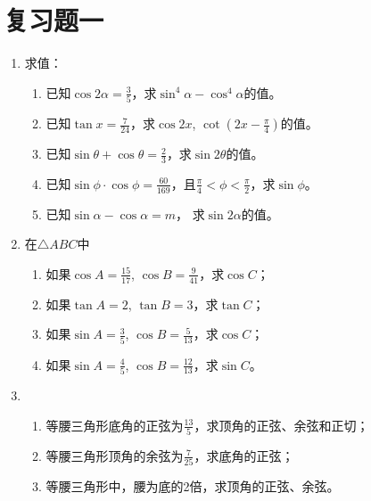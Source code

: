 \section*{复习题一}
\begin{enumerate}
    \item 求值：
\begin{enumerate}
    \item 已知$\cos2\alpha=\frac{3}{5}$，求$\sin^4\alpha-\cos^4\alpha$的值。
    \item 已知$\tan x=\frac{7}{24}$，求$\cos2x$, $\cot\left(2x-\frac{\pi}{4}\right)$的值。
    \item 已知$\sin\theta+\cos\theta=\frac{2}{3}$，求$\sin2\theta$的值。
    \item 已知$\sin\phi\cdot \cos\phi=\frac{60}{169}$，且$\frac{\pi}{4}<\phi<\frac{\pi}{2}$，求$\sin\phi$。
    \item 已知$\sin\alpha-\cos\alpha=m$， 求$\sin2\alpha$的值。
\end{enumerate}

\item 在$\triangle ABC$中
\begin{enumerate}
    \item 如果$\cos A=\frac{15}{17}$, $\cos B=\frac{9}{41}$，求$\cos C$；
    \item 如果$\tan A=2$, $\tan B=3$，求$\tan C$；
    \item 如果$\sin A=\frac{3}{5}$, $\cos B=\frac{5}{13}$，求$\cos C$；
    \item 如果$\sin A=\frac{4}{5}$, $\cos B=\frac{12}{13}$，求$\sin C$。
\end{enumerate}

\item \begin{enumerate}
    \item 等腰三角形底角的正弦为$\frac{13}{5}$，求顶角的正弦、余弦和正切；
    \item 等腰三角形顶角的余弦为$\frac{7}{25}$，求底角的正弦；
    \item 等腰三角形中，腰为底的2倍，求顶角的正弦、余弦。
\end{enumerate}


\end{enumerate}
